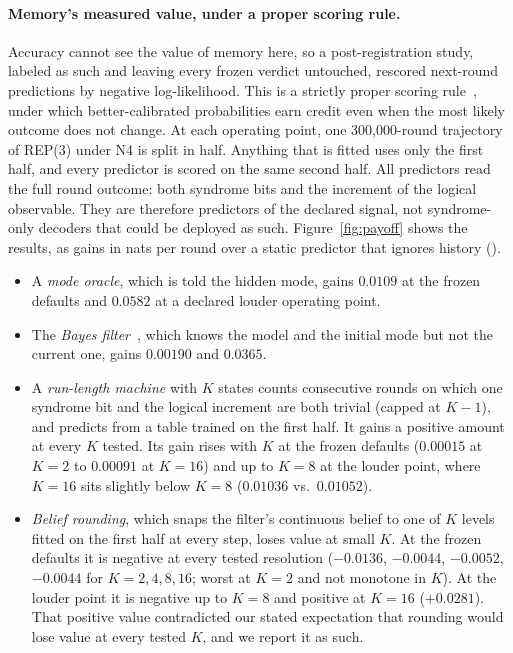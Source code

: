 \paragraph{Memory's measured value, under a proper scoring rule.} Accuracy cannot see the value of memory here, so a post-registration study, labeled as such and leaving every frozen verdict untouched, rescored next-round predictions by negative log-likelihood. This is a strictly proper scoring rule~\cite{gneiting2007proper}, under which better-calibrated probabilities earn credit even when the most likely outcome does not change. At each operating point, one 300{,}000-round trajectory of REP(3) under N4 is split in half. Anything that is fitted uses only the first half, and every predictor is scored on the same second half. All predictors read the full round outcome: both syndrome bits and the increment of the logical observable. They are therefore predictors of the declared signal, not syndrome-only decoders that could be deployed as such. Figure~\ref{fig:payoff} shows the results, as gains in nats per round over a static predictor that ignores history (\gMeasured). %
\begin{itemize}
\item A \emph{mode oracle}, which is told the hidden mode, gains $0.0109$ at the frozen defaults and $0.0582$ at a declared louder operating point. %
\item The \emph{Bayes filter}~\cite{rabiner1989hmm}, which knows the model and the initial mode but not the current one, gains $0.00190$ and $0.0365$. %
\item A \emph{run-length machine} with $K$ states counts consecutive rounds on which one syndrome bit and the logical increment are both trivial (capped at $K-1$), and predicts from a table trained on the first half. It gains a positive amount at every $K$ tested. Its gain rises with $K$ at the frozen defaults ($0.00015$ at $K{=}2$ to $0.00091$ at $K{=}16$) and up to $K{=}8$ at the louder point, where $K{=}16$ sits slightly below $K{=}8$ ($0.01036$ vs.\ $0.01052$). %
\item \emph{Belief rounding}, which snaps the filter's continuous belief to one of $K$ levels fitted on the first half at every step, loses value at small $K$. At the frozen defaults it is negative at every tested resolution ($-0.0136$, $-0.0044$, $-0.0052$, $-0.0044$ for $K = 2, 4, 8, 16$; worst at $K{=}2$ and not monotone in $K$). At the louder point it is negative up to $K{=}8$ and positive at $K{=}16$ ($+0.0281$). That positive value contradicted our stated expectation that rounding would lose value at every tested $K$, and we report it as such. %
\end{itemize}
